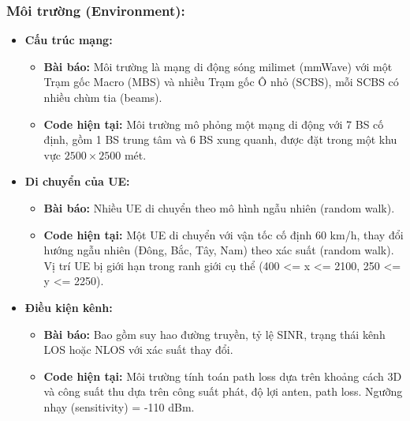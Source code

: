 \documentclass{article} %
\begin{document}
   \subsubsection{Môi trường (Environment):}
\begin{itemize}
    \item \textbf{Cấu trúc mạng:} 
    \begin{itemize}
        \item \textbf{Bài báo:} Môi trường là mạng di động sóng milimet (mmWave) với một Trạm gốc Macro (MBS) và nhiều Trạm gốc Ô nhỏ (SCBS), mỗi SCBS có nhiều chùm tia (beams).
        \item \textbf{Code hiện tại:} Môi trường mô phỏng một mạng di động với 7 BS cố định, gồm 1 BS trung tâm và 6 BS xung quanh, được đặt trong một khu vực $2500 \times 2500$ mét.
    \end{itemize}

    \item \textbf{Di chuyển của UE:} 
    \begin{itemize}
        \item \textbf{Bài báo:} Nhiều UE di chuyển theo mô hình ngẫu nhiên (random walk).
        \item \textbf{Code hiện tại:} Một UE di chuyển với vận tốc cố định 60 km/h, thay đổi hướng ngẫu nhiên (Đông, Bắc, Tây, Nam) theo xác suất (random walk). Vị trí UE bị giới hạn trong ranh giới cụ thể (400 <= x <= 2100, 250 <= y <= 2250).
    \end{itemize}

    \item \textbf{Điều kiện kênh:} 
    \begin{itemize}
        \item \textbf{Bài báo:} Bao gồm suy hao đường truyền, tỷ lệ SINR, trạng thái kênh LOS hoặc NLOS với xác suất thay đổi.
        \item \textbf{Code hiện tại:} Môi trường tính toán path loss dựa trên khoảng cách 3D và công suất thu dựa trên công suất phát, độ lợi anten, path loss. Ngưỡng nhạy (sensitivity) = -110 dBm.
    \end{itemize}


\end{itemize}
\end{document}
